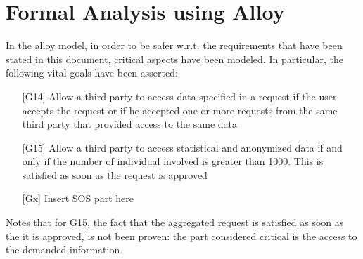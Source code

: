 \section{Formal Analysis using Alloy}
In the alloy model, in order to be safer w.r.t. the requirements that have been stated in this document, critical aspects have been modeled. 
In particular, the following vital goals have been asserted:
\begin{enumerate}
\item[{[G14]}]  Allow a third party to access data specified in a request if the user accepts the request or if he accepted one or more requests from the same third party that provided access to the same data 
\item[{[G15]}] Allow a third party to access statistical and anonymized data if and only if the number of individual involved is greater than 1000. This is satisfied as soon as the request is approved  
\item[{[Gx]}] Insert SOS part here
\end{enumerate}

Notes that for G15, the fact that the aggregated request is satisfied as soon as the it is approved, is not been proven: the part considered critical is the access to the demanded information. \\

